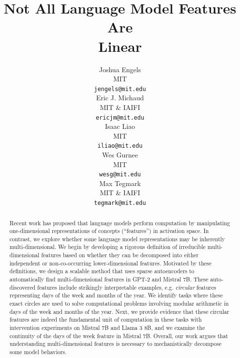 \documentclass{article} %
\title{Not All Language Model Features Are\\ \revThree{One-Dimensionally} Linear}
\author{%
  Joshua Engels \\
  MIT \\
  \texttt{jengels@mit.edu} \\
  \And
  Eric J. Michaud \\
  MIT \& IAIFI \\
  \texttt{ericjm@mit.edu} \\
  \And
  Isaac Liao \\
  MIT \\
  \texttt{iliao@mit.edu} \\
  \AND
  Wes Gurnee \\
  MIT \\
  \texttt{wesg@mit.edu} \\
  \And
  Max Tegmark \\
  MIT \& IAIFI \\
  \texttt{tegmark@mit.edu}
}
\theoremstyle{plain}
\theoremstyle{definition}
\begin{document}
\maketitle

\begin{abstract}
Recent work has proposed that language models perform computation by manipulating one-dimensional representations of concepts (``features'') in activation space. In contrast, we explore whether some language model representations may be inherently multi-dimensional. We begin by developing a rigorous definition of irreducible multi-dimensional features based on whether they can be decomposed into either independent or non-co-occurring lower-dimensional features. Motivated by these definitions, we design a scalable method that uses sparse autoencoders to automatically find multi-dimensional features in GPT-2 and Mistral 7B. These auto-discovered features include strikingly interpretable examples, e.g. \textit{circular} features representing days of the week and months of the year. We identify tasks where these exact circles are used to solve computational problems involving modular arithmetic in days of the week and months of the year. Next, we provide evidence that these circular features are indeed the fundamental unit of computation in these tasks with intervention experiments on Mistral 7B and Llama 3 8B, and we examine the continuity of the days of the week feature in Mistral 7B. Overall, our work argues that understanding multi-dimensional features is necessary to mechanistically decompose some model behaviors.
\end{abstract}



\end{document}
